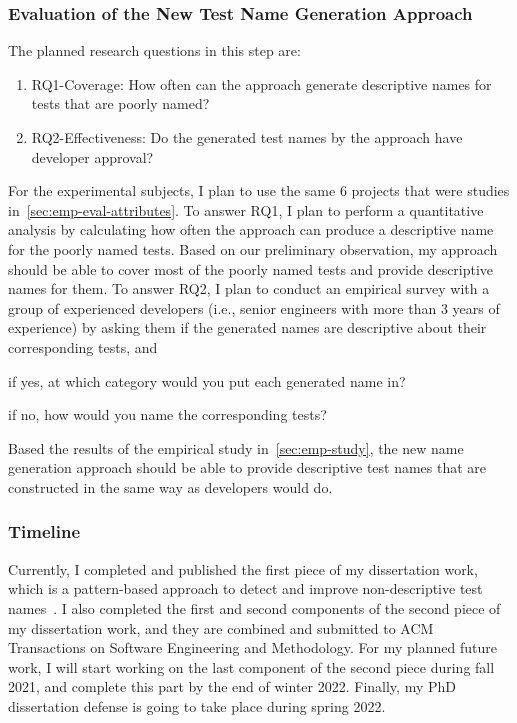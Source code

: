 \subsubsection{Evaluation of the New Test Name Generation Approach}

The planned research questions in this step are:
%
\begin{enumerate}
    \item RQ1-Coverage: How often can the approach generate descriptive names for tests that are poorly named?
    \item RQ2-Effectiveness: Do the generated test names by the approach have developer approval?
\end{enumerate}
%
For the experimental subjects, I plan to use the same \num{6} projects that were studies in~\cref{sec:emp-eval-attributes}.
%
To answer RQ1, I plan to perform a quantitative analysis by calculating how often the approach can produce a descriptive name for the poorly named tests.
%
Based on our preliminary observation, my approach should be able to cover most of the poorly named tests and provide descriptive names for them.
%
To answer RQ2, I plan to conduct an empirical survey with a group of experienced developers (i.e., senior engineers with more than \num{3} years of experience) by asking them if the generated names are descriptive about their corresponding tests, and
\begin{enumerate*}
    \item if yes, at which category would you put each generated name in?
    \item if no, how would you name the corresponding tests?
\end{enumerate*}
%
Based the results of the empirical study in~\cref{sec:emp-study}, the new name generation approach should be able to provide descriptive test names that are constructed in the same way as developers would do.


\subsubsection{Timeline}

Currently, I completed and published the first piece of my dissertation work, which is a pattern-based approach to detect and improve non-descriptive test names~\cite{wu2020pattern}.
%
I also completed the first and second components of the second piece of my dissertation work, and they are combined and submitted to ACM Transactions on Software Engineering and Methodology.
%
For my planned future work, I will start working on the last component of the second piece during fall 2021, and complete this part by the end of winter 2022.
%
Finally, my PhD dissertation defense is going to take place during spring 2022.